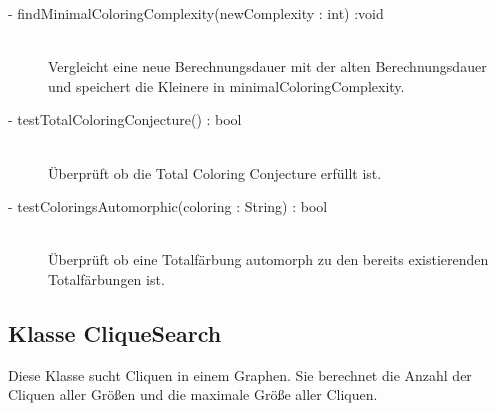 \documentclass[13pt]{scrreprt}
\begin{document}
\begin{itemize}[label = {$\circ$}]
\begin{description}
			\item [- findMinimalColoringComplexity(newComplexity : int) :void] \hfill \\Vergleicht eine neue Berechnungsdauer mit der alten Berechnungsdauer und speichert die Kleinere in minimalColoringComplexity.
			\item [- testTotalColoringConjecture() : bool] \hfill \\Überprüft ob die Total Coloring Conjecture erfüllt ist.
			\item [- testColoringsAutomorphic(coloring : String) : bool] \hfill \\Überprüft ob eine Totalfärbung automorph zu den bereits existierenden Totalfärbungen ist.
		\end{description}
	\end{itemize}
	
	\subsection{Klasse CliqueSearch}
	
	Diese Klasse sucht Cliquen in einem Graphen. Sie berechnet die Anzahl der Cliquen aller Größen und die maximale Größe aller Cliquen.
	
\end{document}
